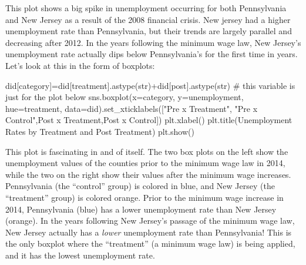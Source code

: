 \documentclass[
  letterpaper,
  DIV=11,
  numbers=noendperiod]{scrreprt}
\newenvironment{Shaded}{\begin{snugshade}}{\end{snugshade}}
\newcommand{\BuiltInTok}[1]{\textcolor[rgb]{0.00,0.23,0.31}{#1}}
\newcommand{\CommentTok}[1]{\textcolor[rgb]{0.37,0.37,0.37}{#1}}
\newcommand{\NormalTok}[1]{\textcolor[rgb]{0.00,0.23,0.31}{#1}}
\newcommand{\OperatorTok}[1]{\textcolor[rgb]{0.37,0.37,0.37}{#1}}
\newcommand{\StringTok}[1]{\textcolor[rgb]{0.13,0.47,0.30}{#1}}
\begin{document}
This plot shows a big spike in unemployment occurring for both
Pennsylvania and New Jersey as a result of the 2008 financial crisis.
New jersey had a higher unemployment rate than Pennsylvania, but their
trends are largely parallel and decreasing after 2012. In the years
following the minimum wage law, New Jersey's unemployment rate actually
dips below Pennsylvania's for the first time in years. Let's look at
this in the form of boxplots:

\begin{Shaded}
\begin{Highlighting}[]
\NormalTok{did[}\StringTok{\textquotesingle{}category\textquotesingle{}}\NormalTok{]}\OperatorTok{=}\NormalTok{did[}\StringTok{\textquotesingle{}treatment\textquotesingle{}}\NormalTok{].astype(}\BuiltInTok{str}\NormalTok{)}\OperatorTok{+}\NormalTok{did[}\StringTok{\textquotesingle{}post\textquotesingle{}}\NormalTok{].astype(}\BuiltInTok{str}\NormalTok{) }\CommentTok{\# this variable is just for the plot below}
\NormalTok{sns.boxplot(x}\OperatorTok{=}\StringTok{\textquotesingle{}category\textquotesingle{}}\NormalTok{, y}\OperatorTok{=}\StringTok{\textquotesingle{}unemployment\textquotesingle{}}\NormalTok{, hue}\OperatorTok{=}\StringTok{\textquotesingle{}treatment\textquotesingle{}}\NormalTok{, data}\OperatorTok{=}\NormalTok{did).set\_xticklabels([}\StringTok{"Pre x Treatment"}\NormalTok{, }\StringTok{"Pre x Control"}\NormalTok{,}\StringTok{\textquotesingle{}Post x Treatment\textquotesingle{}}\NormalTok{,}\StringTok{\textquotesingle{}Post x Control\textquotesingle{}}\NormalTok{]) }
\NormalTok{plt.xlabel(}\StringTok{\textquotesingle{}\textquotesingle{}}\NormalTok{)}
\NormalTok{plt.title(}\StringTok{\textquotesingle{}Unemployment Rates by Treatment and Post Treatment\textquotesingle{}}\NormalTok{)}
\NormalTok{plt.show()}
\end{Highlighting}
\end{Shaded}

This plot is fascinating in and of itself. The two box plots on the left
show the unemployment values of the counties prior to the minimum wage
law in 2014, while the two on the right show their values after the
minimum wage increases. Pennsylvania (the ``control'' group) is colored
in blue, and New Jersey (the ``treatment'' group) is colored orange.
Prior to the minimum wage increase in 2014, Pennsylvania (blue) has a
lower unemployment rate than New Jersey (orange). In the years following
New Jersey's passage of the minimum wage law, New Jersey actually has a
\emph{lower} unemployment rate than Pennsylvania! This is the only
boxplot where the ``treatment'' (a minimum wage law) is being applied,
and it has the lowest unemployment rate.
\end{document}
